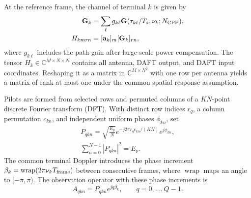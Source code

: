 At the reference frame, the channel of terminal $k$ is given by
\begin{equation}
 \begin{aligned}
 \mathbf G_k&=\sum_\ell g_{k\ell}
 \mathbf G(\tau_{k\ell}/T_s,\nu_k;N_{\rm CPP}),\\
 H_{kmrn}&=[\mathbf a_k]_m[\mathbf G_k]_{rn},
 \end{aligned}
 \label{eq:channel}
\end{equation}
where $g_{k\ell}$ includes the path gain after large-scale power
compensation. The tensor $H_k\in\mathbb C^{M\times N\times N}$ contains
all antenna, DAFT output, and DAFT input coordinates. Reshaping it as a matrix
in $\mathbb C^{M\times N^2}$ with one row per antenna yields a matrix of rank at most one under
the common spatial response assumption.

Pilots are formed from selected rows and permuted columns of a
$KN$-point discrete Fourier transform (DFT). With distinct row indices
$r_q$, a column permutation $c_{kn}$, and independent uniform phases
$\phi_{kn}$, set
\begin{equation}
 \begin{gathered}
 P_{qkn}=\sqrt{\frac{E_p}{N}}
 e^{-j2\pi r_qc_{kn}/(KN)}e^{j\phi_{kn}},\\
 \sum_{n=0}^{N-1}|P_{qkn}|^2=E_p.
 \end{gathered}
 \label{eq:pilot}
\end{equation}
The common terminal Doppler introduces the phase increment
$\beta_k=\operatorname{wrap}(2\pi\nu_kT_{\rm frame})$ between consecutive
frames, where $\operatorname{wrap}$ maps an angle to $[-\pi,\pi)$.
The observation operator with these phase increments is
\begin{equation}
 A_{qkn}=P_{qkn}e^{jq\beta_k},\qquad q=0,\ldots,Q-1.
 \label{eq:effective-pilot}
\end{equation}

